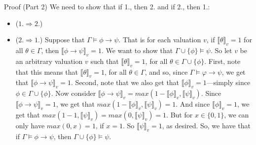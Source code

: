 \documentclass[../slides.tex]{subfiles}
\begin{document}
\begin{frame}{Proof (Part 2)}
We need to show that if 1., then 2. and if 2., then 1.:
			
			\begin{itemize}
			
				\item ($1.\Rightarrow 2.$) \checkmark
				
				\item ($2.\Rightarrow 1.$) Suppose that $\Gamma\vDash\phi\to\psi$. That is for each valuation $v$, if $\llbracket\theta\rrbracket_v=1$ for all $\theta\in\Gamma$, then $\llbracket\phi\to\psi\rrbracket_v=1$. We want to show that $\Gamma\cup\{\phi\}\vDash\psi$. So let $v$ be an arbitrary valuation $v$ such that $\llbracket\theta\rrbracket_v=1$, for all $\theta\in \Gamma\cup\{\phi\}$. First, note that this means that $\llbracket\theta\rrbracket_v=1$, for all $\theta\in \Gamma$, and so, since $\Gamma\vDash\varphi\to\psi$, we get that $\llbracket\phi\to\psi\rrbracket_v=1$. Second, note that we also get that $\llbracket\phi\rrbracket_v=1$---simply since $\phi\in\Gamma\cup\{\phi\}$. Now consider $\llbracket\phi\to\psi\rrbracket_v=max(1-\llbracket\phi\rrbracket_v,\llbracket\psi\rrbracket_v)$. Since $\llbracket\phi\to\psi\rrbracket_v=1$, we get that $max(1-\llbracket\phi\rrbracket_v,\llbracket\psi\rrbracket_v)=1$. And since $\llbracket\phi\rrbracket_v=1$, we get that $max(1-1,\llbracket\psi\rrbracket_v)=max(0,\llbracket\psi\rrbracket_v)=1$. But for $x\in\{0,1\}$, we can only have $max(0,x)=1$, if $x=1$. So $\llbracket\psi\rrbracket_v=1$, as desired. So, we have that if $\Gamma\vDash\phi\to\psi$, then $\Gamma\cup\{\phi\}\vDash\psi$.

\end{itemize}

\end{frame}
\end{document}
